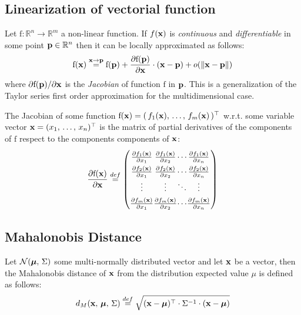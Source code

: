 	\subsection{Linearization of vectorial function}
		\label{app.jacobian}
		Let $\mathrm{f} : \mathbb{R}^n \rightarrow \mathbb{R}^m$ a non-linear function.
		If $f(\boldsymbol{\mathrm{{x}}})$ is \emph{continuous} and \emph{differentiable} in some point $\boldsymbol{\mathrm{{p}}} \in \mathbb{R}^n$ then it can be locally approximated as follows:
		\begin{equation}
			\mathrm{f}(\boldsymbol{\mathrm{{x}}}) \stackrel{\boldsymbol{\mathrm{{x}}} \rightarrow \boldsymbol{\mathrm{{p}}}}{=} \mathrm{f}(\boldsymbol{\mathrm{{p}}}) + \frac{\partial\mathrm{f}(\boldsymbol{\mathrm{{p}}})}{\partial\boldsymbol{\mathrm{{x}}}} \cdot (\boldsymbol{\mathrm{{x}}} - \boldsymbol{\mathrm{{p}}}) + o(\| \boldsymbol{\mathrm{{x}}} - \boldsymbol{\mathrm{{p}}} \|)
		\end{equation}
		where ${\partial\mathrm{f}(\boldsymbol{\mathrm{{p}}})}/{\partial\boldsymbol{\mathrm{{x}}}}$ is the \emph{Jacobian} of function $\mathrm{f}$ in $\boldsymbol{\mathrm{{p}}}$. This is a generalization of the Taylor series first order approximation for the multidimensional case. 
		
		The Jacobian of some function $\mathrm{f}(\boldsymbol{\mathrm{{x}}}) = (\, f_1(\boldsymbol{\mathrm{{x}}}),\, \ldots,\, f_m(\boldsymbol{\mathrm{{x}}}) \,)^\top$ w.r.t. some variable vector $\boldsymbol{\mathrm{{x}}} = (x_1,\, \ldots,\, x_n)^\top$ is the matrix of partial derivatives of the components of $\mathrm{f}$ respect to the components components of $\boldsymbol{\mathrm{{x}}}$:
		\begin{equation}
			\arraycolsep=.1pt\def\arraystretch{1.5}
			\frac{\partial\mathrm{f}(\vect{x})}{\partial\vect{x}} \stackrel{def}{=}
			\left(\begin{array}{cccc}
				\frac{\partial f_1(\vect{x})}{\partial x_1} & \frac{\partial f_1(\vect{x})}{\partial x_2} & \cdots & \frac{\partial f_1(\vect{x})}{\partial x_n} \\
				\frac{\partial f_2(\vect{x})}{\partial x_1} & \frac{\partial f_2(\vect{x})}{\partial x_2} & \cdots & \frac{\partial f_2(\vect{x})}{\partial x_n} \\
				\vdots & \vdots & \ddots & \vdots \\
				\frac{\partial f_m(\vect{x})}{\partial x_1} & \frac{\partial f_m(\vect{x})}{\partial x_2} & \cdots & \frac{\partial f_m(\vect{x})}{\partial x_n} \\
			\end{array}\right)
		\end{equation}
	
	\subsection{Mahalonobis Distance}
		\label{app.mahalonobis}
		Let $\mathcal{N}(\boldsymbol{\mathrm{{\mu}}},\, \Sigma)$ some multi-normally distributed vector and let $\boldsymbol{\mathrm{{x}}}$ be a vector, then the Mahalonobis distance of $\boldsymbol{\mathrm{{x}}}$ from the distribution expected value $\mu$ is defined as follows:
		\begin{equation}
			d_M(\boldsymbol{\mathrm{{x}}},\, \boldsymbol{\mathrm{{\mu}}},\, \Sigma) \stackrel{def}{=} \sqrt{(\boldsymbol{\mathrm{{x}}} - \boldsymbol{\mathrm{{\mu}}})^\top \cdot \Sigma^{-1} \cdot (\boldsymbol{\mathrm{{x}}} - \boldsymbol{\mathrm{{\mu}}})}
		\end{equation} 
		
